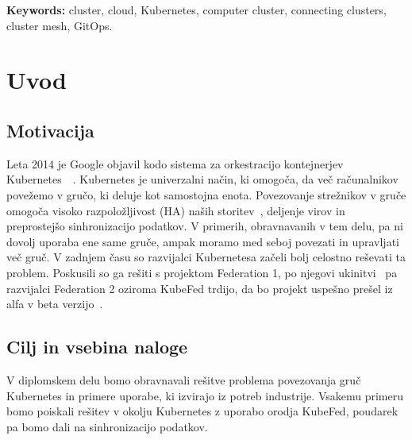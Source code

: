 \documentclass[a4paper, 12pt]{book}
\newcommand{\tkeywordsEn}{cluster, cloud, Kubernetes, computer cluster, connecting clusters, cluster mesh, GitOps}
\newcommand{\clearemptydoublepage}{\newpage{\pagestyle{empty}\cleardoublepage}}
\begin{document}
\bigskip
\noindent\textbf{Keywords:} \tkeywordsEn.
\clearemptydoublepage
\mainmatter
\setcounter{page}{1}
\pagestyle{fancy}
\chapter{Uvod}
\label{uvod}
\section{Motivacija}
Leta 2014 je Google objavil kodo sistema za orkestracijo kontejnerjev Kubernetes~\cite{what-is-Kubernetes}~\cite{borg-omega-kubernetes}.
Kubernetes  je univerzalni način, ki omogoča, da več ra\-ču\-nal\-ni\-kov povežemo v gručo, ki deluje kot samostojna enota. 
Povezovanje strežnikov v gruče omogoča visoko razpoložljivost (HA) naših storitev~\cite{mastering-kubernetes}, deljenje virov in preprostejšo sinhronizacijo podatkov.
V primerih, obravnavanih v tem delu, pa ni dovolj uporaba ene same gruče, ampak moramo med seboj povezati in upravljati več gruč.
V zadnjem času so razvijalci Kubernetesa začeli bolj celostno reševati ta problem.
Poskusili so ga rešiti s projektom Federation 1, po njegovi ukinitvi~\cite{kubernetes-federation-evolution} pa razvijalci Federation 2 oziroma KubeFed trdijo, da bo projekt uspešno prešel iz alfa v beta verzijo~\cite{kubefed-repo}.
\section{Cilj in vsebina naloge}
V diplomskem delu bomo obravnavali rešitve problema povezovanja gruč Kubernetes in primere uporabe, ki izvirajo iz potreb industrije.
Vsakemu primeru bomo poiskali rešitev v okolju Kubernetes z uporabo orodja KubeFed, poudarek pa bomo dali na sinhronizacijo podatkov.
\end{document}
